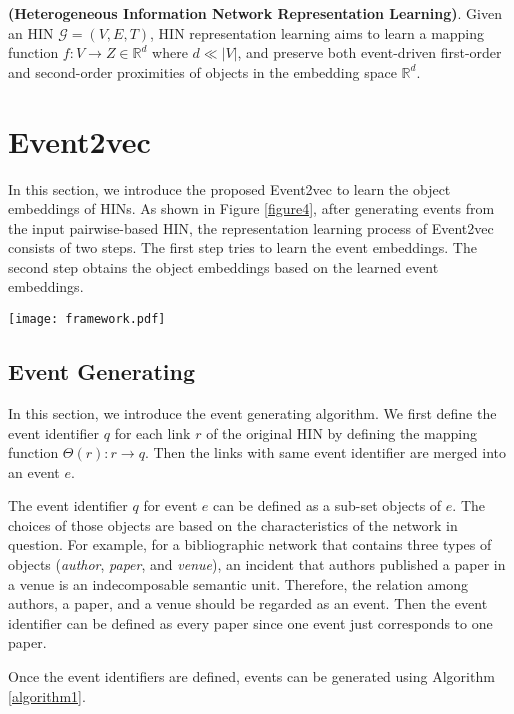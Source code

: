 \begin{mydef}
	\textbf{(Heterogeneous Information Network Representation Learning)}. Given an HIN $\mathcal{G}=(V, E, T)$, HIN representation learning aims to learn a mapping function $f:V \rightarrow Z \in \mathbb{R}^d$ where $d \ll |V|$, and preserve both event-driven first-order and second-order proximities of objects in the embedding space $\mathbb{R}^d$.
\end{mydef}

\section{Event2vec}
In this section, we introduce the proposed Event2vec to learn the object embeddings of HINs. As shown in Figure \ref{figure4}, after generating events from the input pairwise-based HIN, the representation learning process of Event2vec consists of two steps. The first step tries to learn the event embeddings. The second step obtains the object embeddings based on the learned event embeddings.

\begin{figure*}
	\centering
	\texttt{[image: framework.pdf]}
	\caption{{\small The framework of Event2vec.}}\label{figure4}
\end{figure*}

\subsection{Event Generating}
In this section, we introduce the event generating algorithm. We first define the event identifier $q$ for each link $r$ of the original HIN by defining the mapping function $\Theta(r): r\rightarrow q$. Then the links with same event identifier are merged into an event $e$.

The event identifier $q$ for event $e$ can be defined as a sub-set objects of $e$. The choices of those objects are based on the characteristics of the network in question. For example, for a bibliographic network that contains three types of objects ({\itshape author}, {\itshape paper}, and {\itshape venue}), an incident that authors published a paper in a venue is an indecomposable semantic unit. Therefore, the relation among authors, a paper, and a venue should be regarded as an event. Then the event identifier can be defined as every paper since one event just corresponds to one paper.

Once the event identifiers are defined, events can be generated using Algorithm \ref{algorithm1}.

